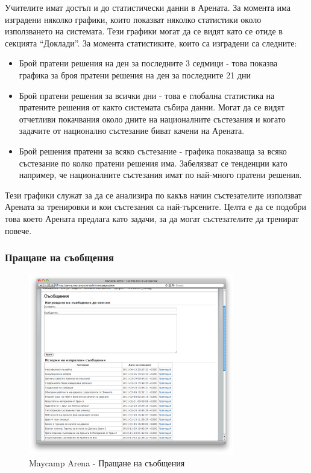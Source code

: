 \documentclass[a4paper,12pt]{article}
\begin{document}
  Учителите имат достъп и до статистически данни в Арената. За момента има изградени няколко графики, които показват няколко статистики около използването на системата. Тези графики могат да се видят като се отиде в секцията ``Доклади''. За момента статистиките, които са изградени са следните:
  
  \begin{itemize}
    \item Брой пратени решения на ден за последните 3 седмици - това показва графика за броя пратени решения на ден за последните 21 дни
    \item Брой пратени решения за всички дни - това е глобална статистика на пратените решения от както системата събира данни. Могат да се видят отчетливи покачвания около дните на националните състезания и когато задачите от национално състезание биват качени на Арената.
    \item Брой решения пратени за всяко състезание - графика показваща за всяко състезание по колко пратени решения има. Забелязват се тенденции като например, че националните състезания имат по най-много пратени решения.
  \end{itemize}
  
  Тези графики служат за да се анализира по какъв начин състезателите използват Арената за тренировки и кои състезания са най-търсените. Целта е да се подобри това което Арената предлага като задачи, за да могат състезателите да тренират повече.
  
  \subsubsection{Пращане на съобщения}

  \begin{figure}[ht]
    \begin{center}
      \includegraphics[width=0.8\textwidth]{images/maycamp_arena_messages.png}
    \end{center}
    \caption{Maycamp Arena - Пращане на съобщения}
    \label{arena_messages}
  \end{figure}
  
\end{document}
